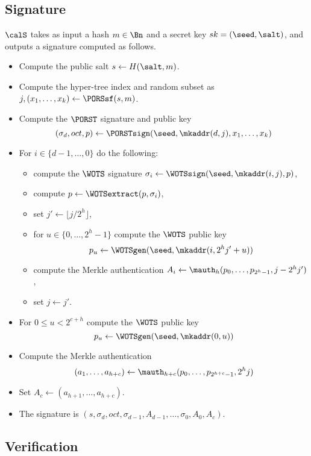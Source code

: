 \subsection{Signature}

$\calS$ takes as input a hash $m \in \Bn$ and a secret key $sk = (\seed, \salt)$, and outputs a signature computed as follows.

\begin{itemize}
\item Compute the public salt $s \gets H(\salt, m)$.
\item Compute the hyper-tree index and random subset as $j, (x_1, \ldots, x_k) \gets \PORSsf(s, m)$.
\item Compute the $\PORST$ signature and public key
    \[(\sigma_d, oct, p) \gets \PORSTsign(\seed, \mkaddr(d, j), x_1, \ldots, x_k)\]
\item For $i \in \{d-1, \ldots, 0\}$ do the following:
    \begin{itemize}
    \item compute the $\WOTS$ signature $\sigma_i \gets \WOTSsign(\seed, \mkaddr(i, j), p)$,
    \item compute $p \gets \WOTSextract(p, \sigma_i)$,
    \item set $j' \gets \lfloor j / 2^h \rfloor$,
    \item for $u \in \{0, \ldots, 2^h-1\}$ compute the $\WOTS$ public key
        \[p_u \gets \WOTSgen(\seed, \mkaddr(i, 2^h j' + u))\]
    \item compute the Merkle authentication $A_i \gets \mauth_h(p_0, \ldots, p_{2^h-1}, j - 2^h j')$,
    \item set $j \gets j'$.
    \end{itemize}
\item For $0 \le u < 2^{c+h}$ compute the $\WOTS$ public key
    \[p_u \gets \WOTSgen(\seed, \mkaddr(0, u))\]
\item Compute the Merkle authentication
    \[(a_1, \ldots, a_{h+c}) \gets \mauth_{h+c}(p_0, \ldots, p_{2^{h+c}-1}, 2^h j)\]
\item Set $A_c \gets (a_{h+1}, \ldots, a_{h+c})$.
\item The signature is $(s, \sigma_d, oct, \sigma_{d-1}, A_{d-1}, \ldots, \sigma_0, A_0, A_c)$.
\end{itemize}

\subsection{Verification}

